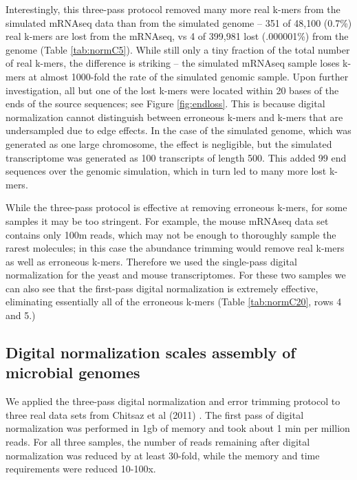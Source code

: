 \documentclass{pnastwo}
\begin{document}
\begin{article}
Interestingly, this three-pass protocol removed many more real k-mers
from the simulated mRNAseq data than from the simulated genome -- 351
of 48,100 (0.7\%) real k-mers are lost from the mRNAseq, vs 4 of
399,981 lost (.000001\%) from the genome (Table \ref{tab:normC5}).
While still only a tiny fraction of the total number of real k-mers,
the difference is striking -- the simulated mRNAseq sample loses k-mers
at almost 1000-fold the rate of the simulated genomic sample.  Upon
further investigation, all but one of the lost k-mers were located
within 20 bases of the ends of the source sequences; see Figure
\ref{fig:endloss}.  This is because digital normalization cannot
distinguish between erroneous k-mers and k-mers that are undersampled
due to edge effects.  In the case of the simulated genome, which was
generated as one large chromosome, the effect is negligible, but the
simulated transcriptome was generated as 100 transcripts of length
500.  This added 99 end sequences over the genomic simulation, which
in turn led to many more lost k-mers.

While the three-pass protocol is effective at removing erroneous
k-mers, for some samples it may be too stringent.  For example, the
mouse mRNAseq data set contains only 100m reads, which may not be
enough to thoroughly sample the rarest molecules; in this case the
abundance trimming would remove real k-mers as well as erroneous k-mers.
Therefore we used the single-pass digital normalization
for the yeast and mouse transcriptomes.  For these two samples we can
also see that the first-pass digital normalization is extremely effective,
eliminating essentially all of the erroneous k-mers (Table \ref{tab:normC20},
rows 4 and 5.)

\subsection{Digital normalization scales assembly of microbial genomes}

We applied the three-pass digital normalization and error trimming
protocol to three real data sets from Chitsaz et al (2011)
\cite{pubmed21926975}.  The first pass of digital normalization was
performed in 1gb of memory and took about 1 min per million reads.
For all three samples, the number of reads remaining after digital
normalization was reduced by at least 30-fold, while the memory and
time requirements were reduced 10-100x.



\end{article}
\end{document}
